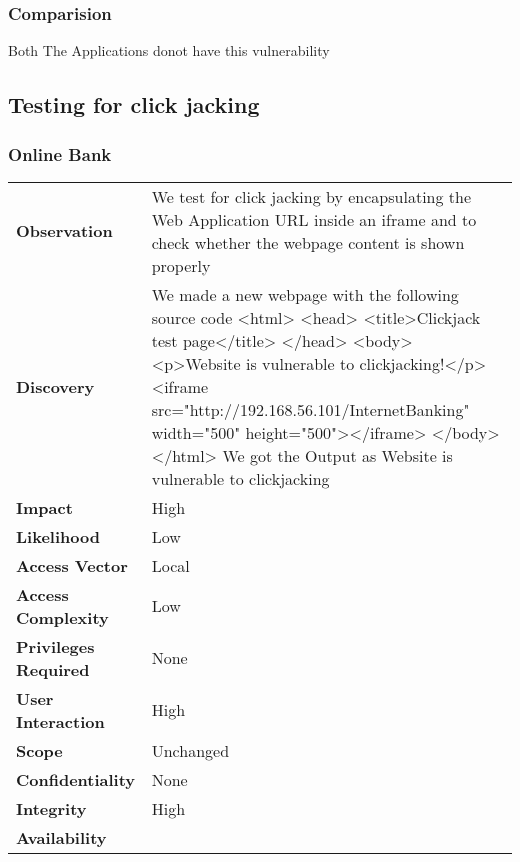 \subsubsection{Comparision}
Both The Applications donot have this vulnerability

\subsection{Testing for click jacking}
\subsubsection{Online Bank}
\begin{tabular}{l|p{10cm}}
\textbf{Observation} & We test for click jacking by encapsulating the Web Application URL inside an iframe and to check whether the webpage content is shown properly   \\
\textbf{Discovery} & We made a new webpage with the following source code
<html>
   <head>
     <title>Clickjack test page</title>
   </head>
   <body>
     <p>Website is vulnerable to clickjacking!</p>
     <iframe src="http://192.168.56.101/InternetBanking" width="500" height="500"></iframe>
   </body>
</html>
We got the Output as Website is vulnerable to clickjacking
 \\
\textbf{Impact} &  High\\
\textbf{Likelihood} & Low \\
\textbf{Access Vector} & Local \\
\textbf{Access Complexity} &  Low\\
\textbf{Privileges Required} & None \\
\textbf{User Interaction} & High \\
\textbf{Scope} & Unchanged \\
\textbf{Confidentiality} & None \\
\textbf{Integrity} & High \\
\textbf{Availability} &  \\
\end{tabular}

